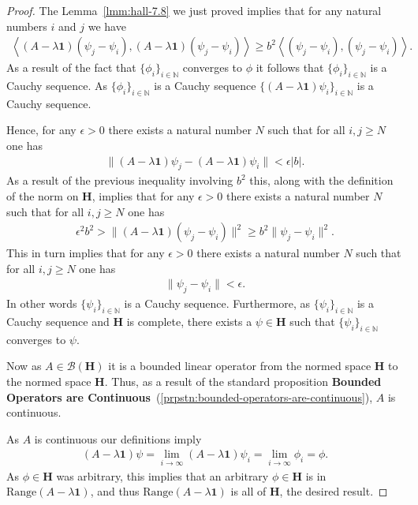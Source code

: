 \begin{proof}
The Lemma~\ref{lmm:hall-7.8} we just proved implies that for any natural numbers $i$ and $j$ we have
\begin{align}
    \left< (A - \lambda \mathbf{1}) (\psi_j - \psi_i), (A - \lambda \mathbf{1}) (\psi_j - \psi_i) \right> \ge b^2 \left< (\psi_j - \psi_i), (\psi_j - \psi_i) \right>.
\end{align}
As a result of the fact that $\{ \phi_i \}_{i \in \mathbb{N}}$ converges to $\phi$ it follows that $\{ \phi_i \}_{i \in \mathbb{N}}$ is a Cauchy sequence. As $\{ \phi_i \}_{i \in \mathbb{N}}$ is a Cauchy sequence $\{ (A - \lambda \mathbf{1}) \psi_i \}_{i \in \mathbb{N}}$ is a Cauchy sequence.

Hence, for any $\epsilon > 0$ there exists a natural number $N$ such that for all $i,j \ge N$ one has
\begin{align}
    \| (A - \lambda \mathbf{1}) \psi_j - (A - \lambda \mathbf{1}) \psi_i \| < \epsilon \lvert b \rvert.
\end{align}
As a result of the previous inequality involving $b^2$ this, along with the definition of the norm on $\mathbf{H}$, implies that for any $\epsilon > 0$ there exists a natural number $N$ such that for all $i,j \ge N$ one has
\begin{align}
    \epsilon^2 b^2 > \| (A - \lambda \mathbf{1}) (\psi_j - \psi_i) \|^2 \ge b^2 \|\psi_j - \psi_i\|^2.
\end{align}
This in turn implies that for any $\epsilon > 0$ there exists a natural number $N$ such that for all $i,j \ge N$ one has
\begin{align}
    \|\psi_j - \psi_i\| < \epsilon.
\end{align}
In other words $\{ \psi_i \}_{i \in \mathbb{N}}$ is a Cauchy sequence. Furthermore, as $\{ \psi_i \}_{i \in \mathbb{N}}$ is a Cauchy sequence and $\mathbf{H}$ is complete, there exists a $\psi \in \mathbf{H}$ such that $\{ \psi_i \}_{i \in \mathbb{N}}$ converges to $\psi$.

Now as $A \in \mathcal{B}(\mathbf{H})$ it is a bounded linear operator from the normed space $\mathbf{H}$ to the normed space $\mathbf{H}$. Thus, as a result of the standard proposition \textbf{Bounded Operators are Continuous}~(\ref{prpstn:bounded-operators-are-continuous}), $A$ is continuous.

As $A$ is continuous our definitions imply
\begin{align}
    (A - \lambda \mathbf{1}) \psi = \lim\limits_{i \rightarrow \infty} (A - \lambda \mathbf{1}) \psi_i = \lim\limits_{i \rightarrow \infty} \phi_i = \phi.
\end{align}
As $\phi \in \mathbf{H}$ was arbitrary, this implies that an arbitrary $\phi \in \mathbf{H}$ is in $\text{Range}(A - \lambda \mathbf{1})$, and thus $\text{Range}(A - \lambda \mathbf{1})$ is all of $\mathbf{H}$, the desired result.


\end{proof}
